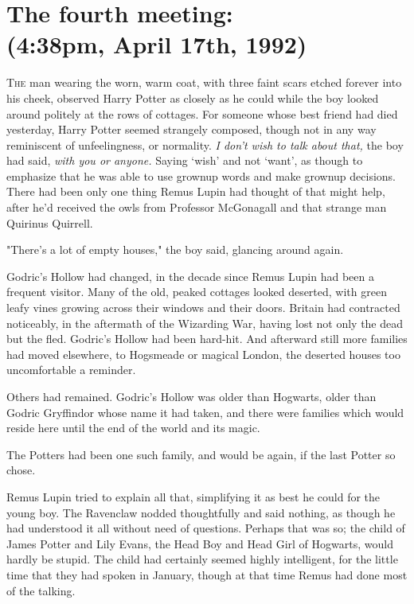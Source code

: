 
\section[The fourth meeting:\\
(4:38pm, April 17th, 1992)]{The fourth meeting:\\
(4:38pm, April 17th, 1992)\protect\footnotemark}


\lettrine{T}{he} man wearing the worn, warm coat, with three faint scars etched forever into
his cheek, observed Harry Potter as closely as he could while the boy looked
around politely at the rows of cottages. For someone whose best friend had died
yesterday, Harry Potter seemed strangely composed, though not in any way
reminiscent of unfeelingness, or normality. \emph{I don't wish to talk about
that,} the boy had said, \emph{with you or anyone.} Saying `wish' and not
`want', as though to emphasize that he was able to use grownup words and make
grownup decisions. There had been only one thing Remus Lupin had thought of
that might help, after he'd received the owls from Professor McGonagall and
that strange man Quirinus Quirrell.

"There's a lot of empty houses," the boy said, glancing around again.

Godric's Hollow had changed, in the decade since Remus Lupin had been a
frequent visitor. Many of the old, peaked cottages looked deserted, with green
leafy vines growing across their windows and their doors. Britain had
contracted noticeably, in the aftermath of the Wizarding War, having lost not
only the dead but the fled. Godric's Hollow had been hard-hit. And afterward
still more families had moved elsewhere, to Hogsmeade or magical London, the
deserted houses too uncomfortable a reminder.

Others had remained. Godric's Hollow was older than Hogwarts, older than Godric
Gryffindor whose name it had taken, and there were families which would reside
here until the end of the world and its magic.

The Potters had been one such family, and would be again, if the last Potter so
chose.

Remus Lupin tried to explain all that, simplifying it as best he could for the
young boy. The Ravenclaw nodded thoughtfully and said nothing, as though he had
understood it all without need of questions. Perhaps that was so; the child of
James Potter and Lily Evans, the Head Boy and Head Girl of Hogwarts, would
hardly be stupid. The child had certainly seemed highly intelligent, for the
little time that they had spoken in January, though at that time Remus had done
most of the talking.

